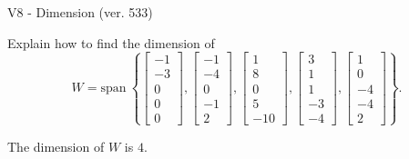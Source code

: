 \begin{exercise}
  \begin{exerciseTitle}V8 - Dimension (ver. 533)\end{exerciseTitle}
  \begin{exerciseStatement}
    Explain how to find the dimension of 
\[W=\mathrm{span}\ \left\{\left[\begin{array}{r}
-1 \\
-3 \\
0 \\
0 \\
0
\end{array}\right] , \left[\begin{array}{r}
-1 \\
-4 \\
0 \\
-1 \\
2
\end{array}\right] , \left[\begin{array}{r}
1 \\
8 \\
0 \\
5 \\
-10
\end{array}\right] , \left[\begin{array}{r}
3 \\
1 \\
1 \\
-3 \\
-4
\end{array}\right] , \left[\begin{array}{r}
1 \\
0 \\
-4 \\
-4 \\
2
\end{array}\right]\right\}.\]



  \end{exerciseStatement}
  \begin{exerciseAnswer}
   The dimension of \(W\) is  \(4\).
  


  \end{exerciseAnswer}
\end{exercise}